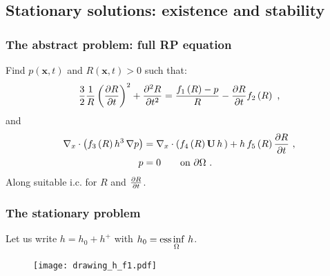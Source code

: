 \documentclass[10pt,aspectratio=169]{beamer}
\begin{document}

\subsection{Stationary solutions: existence and stability}
\setcounter{showSlideNumbers}{0}
\begin{frame}[noframenumbering]
\tableofcontents[
currentsection,
currentsubsection,
subsectionstyle=show/shaded/hide
]
\end{frame}
\setcounter{showSlideNumbers}{1}


\begin{frame}
\frametitle{The abstract problem: full RP equation}
Find $p(\mathbf{x},t)$ and $R(\mathbf{x},t)>0$ such that:
\begin{equation*}
\frac{3}{2}\frac{1}{R}\left(\frac{\partial R}{\partial t}\right)^2+\frac{\partial^2 R}{\partial t^2}=\frac{f_1\left(R\right)-p}{R}-\frac{\partial R}{\partial t}f_2\left(R\right)~,
\end{equation*}
and
\begin{align*}
\begin{split}
\nabla_x\cdot \left(f_3\left(R\right) h^3\,\nabla p\right)&=\nabla_x\cdot \left(f_4\left(R\right)\mathbf{U}\,h\,\right)+h\,f_5\left(R\right)\frac{\partial R}{\partial t}~,\\
p&=0 \qquad\mbox{on } \partial \Omega~.
\end{split}
\end{align*}
Along suitable i.c. for $R$ and $\frac{\partial R}{\partial t}$.
\end{frame} 


\begin{frame}
\frametitle{The stationary problem}\vspace*{0.5cm}
Let us write $h=h_0+h^+$ with $h_0=\underset{\Omega}{\operatorname*{ess\,inf}{\,h}}$.
\begin{figure}[h]
	\texttt{[image: drawing\_h\_f1.pdf]}
\end{figure}
\end{frame} 
\end{document}
